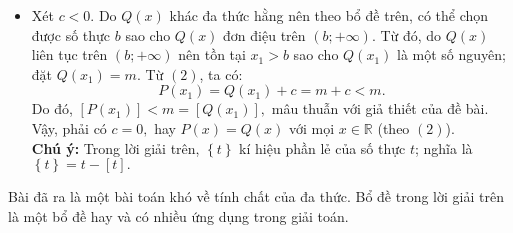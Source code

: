 \begin{bt}
{\begin{itemize}
$$Q(x_0)=P(x_0)-c=k-c<k.$$
Do đó, $\left[Q(x_0)\right]<k=\left[P(x_0)\right],$ mâu thuẫn với giả thiết của đề bài.
\item Xét $c<0.$ Do $Q(x)$ khác đa thức hằng nên theo bổ đề trên, có thể chọn được số thực $b$ sao cho $Q(x)$ đơn điệu trên $(b;+\infty).$ Từ đó, do $Q(x)$ liên tục trên $(b;+\infty)$  nên tồn tại $x_1>b$  sao cho $Q(x_1)$ là một số nguyên; đặt $Q(x_1)=m.$ Từ $(2)$, ta có: 
$$P(x_1)=Q(x_1)+c=m+c<m.$$
Do đó, $\left[P(x_1)\right]<m=\left[Q(x_1)\right],$ mâu thuẫn với giả thiết của đề bài.
Vậy, phải có $c=0,$ hay $P(x)=Q(x)$ với mọi $x\in \mathbb{R}$ (theo $(2)$).\\
\textbf{Chú ý:} Trong lời giải trên, $\left\{t\right\}$ kí hiệu phần lẻ của số thực $t$; nghĩa là $\left\{t\right\}=t-\left[t\right].$ 
\end{itemize}
\begin{nx}
 Bài đã ra là một bài toán khó về tính chất của đa thức.
 Bổ đề trong lời giải trên là một bổ đề hay và có nhiều ứng dụng trong giải toán.
\end{nx}
}
\end{bt}
		
